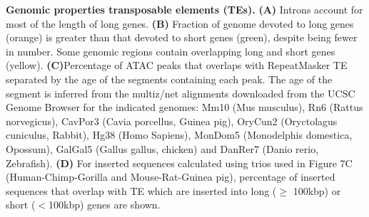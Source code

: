 \textbf{Genomic properties transposable elements (TEs).} 
\textbf{(A)} Introns account for most of the length of long genes. 
\textbf{(B)} Fraction of genome devoted to long genes (orange) is greater than that devoted to short genes (green), despite being fewer in number. Some genomic regions contain overlapping long and short genes (yellow).
\textbf{(C)}Percentage of ATAC peaks that overlaps with RepeatMasker TE separated by the age of the segments containing each peak. The age of the segment is inferred from the multiz/net alignments downloaded from the UCSC Genome Browser for the indicated genomes: Mm10 (Mus musculus), Rn6 (Rattus norvegicus), CavPor3 (Cavia porcellus, Guinea pig), OryCun2 (Oryctolagus cuniculus, Rabbit), Hg38 (Homo Sapiens), MonDom5 (Monodelphis domestica, Opossum), GalGal5 (Gallus gallus, chicken) and DanRer7 (Danio rerio, Zebrafish). 
\textbf{(D)} For inserted sequences calculated using trios used in Figure 7C (Human-Chimp-Gorilla and Mouse-Rat-Guinea pig), percentage of inserted sequences that overlap with TE which are inserted into long ($\geq$ 100kbp) or short ($<$100kbp) genes are shown. 